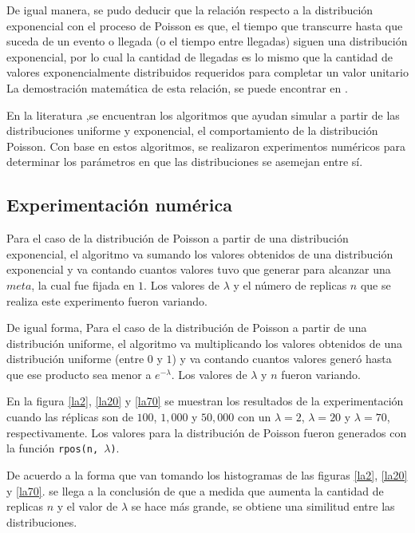 \documentclass{article}
\begin{document}
De igual manera, se pudo deducir que la relación respecto a la distribución exponencial con el proceso de Poisson es que, el tiempo que transcurre hasta que suceda de un evento o llegada (o el tiempo entre llegadas) siguen una distribución exponencial, por lo cual la cantidad de llegadas es lo mismo que la cantidad de valores exponencialmente distribuidos requeridos para completar un valor unitario \cite{notasElisa} La demostración matemática de esta relación, se puede encontrar en \cite{taylor, walpole}.

En la literatura \cite{notasclase, knuth, devroye},se encuentran los algoritmos que ayudan simular a partir de las distribuciones uniforme y exponencial, el comportamiento de la distribución Poisson. Con base en estos algoritmos, se realizaron experimentos numéricos para determinar los parámetros en que las distribuciones se asemejan entre sí.
  
\subsection{Experimentación numérica}

Para el caso de la distribución de Poisson a partir de una distribución exponencial, el algoritmo va sumando los valores obtenidos de una distribución exponencial y va contando cuantos valores tuvo que generar para alcanzar una $meta$, la cual fue fijada en $1$. Los valores de $\lambda$ y el número de replicas $n$ que se realiza este experimento fueron variando.

De igual forma, Para el caso de la distribución de Poisson a partir de una distribución uniforme, el algoritmo va multiplicando los valores obtenidos de una distribución uniforme (entre $0$ y $1$) y va contando cuantos valores generó hasta que ese producto sea menor a $e^{-\lambda}$. Los valores de $\lambda$ y $n$ fueron variando.

En la figura \ref{la2}, \ref{la20} y \ref{la70} se muestran los resultados de la experimentación cuando las réplicas son de $100$, $1,000$ y $50,000$ con un $\lambda = 2$, $\lambda = 20$ y $\lambda = 70$, respectivamente. Los valores para la distribución de Poisson fueron generados con la función \texttt{rpos(n, $\lambda$)}.

De acuerdo a la forma que van tomando los histogramas de las figuras \ref{la2}, \ref{la20} y \ref{la70}. se llega a la conclusión de que a medida que aumenta la cantidad de replicas $n$ y el valor de $\lambda$ se hace más grande, se obtiene una similitud entre las distribuciones.
\end{document}
